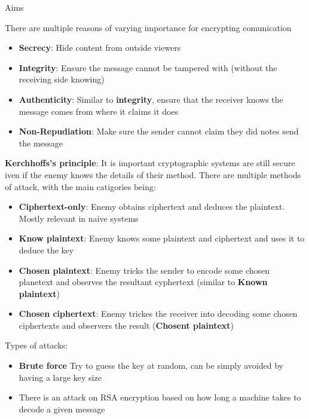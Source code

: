 \documentclass[12pt, letterpaper]{article}
\begin{document}
\begin{section}{Aims}

  There are multiple reasons of varying importance for encrypting comunication
  \begin{itemize}
    \item \textbf{Secrecy}: Hide content from outside viewers
    \item \textbf{Integrity}: Ensure the message cannot be tampered with
          (without the receiving side knowing)
    \item \textbf{Authenticity}: Similar to \textbf{integrity}, ensure that the
          receiver knows the message comes from where it claims it does
    \item \textbf{Non-Repudiation}: Make sure the sender cannot claim they did
          notes send the message
  \end{itemize}

  \textbf{Kerchhoffs's principle}: It is important cryptographic systems are
  still secure iven if the enemy knows the details of their method.
  There are multiple methods of attack, with the main catigories being:
  \begin{itemize}
    \item \textbf{Ciphertext-only}: Enemy obtains ciphertext and deduces the
          plaintext. Mostly relevant in naive systems
    \item \textbf{Know plaintext}: Enemy knows some plaintext and ciphertext and
          uses it to deduce the key
    \item \textbf{Chosen plaintext}: Enemy tricks the sender to encode some
          chosen planetext and observes the resultant cyphertext (similar to
          \textbf{Known plaintext})
    \item \textbf{Chosen ciphertext}: Enemy trickes the receiver into decoding
          some chosen ciphertexts and observers the result (\textbf{Chosent
          plaintext})
    \end{itemize}

    Types of attacks:
    \begin{itemize}
      \item \textbf{Brute force} Try to guess the key at random, can be simply
            avoided by having a large key size
      \item There is an attack on RSA encryption based on how long a machine
            takes to decode a given message
    \end{itemize}

\end{section}
\end{document}
